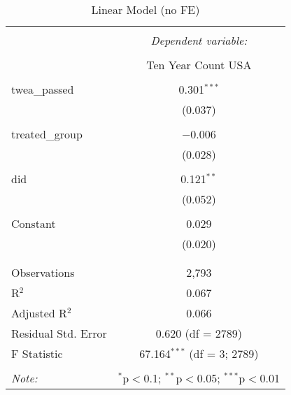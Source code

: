 
\begin{table}[!htbp] \centering 
  \caption{Linear Model (no FE)} 
  \label{table3.1} 
\begin{tabular}{@{\extracolsep{5pt}}lc} 
\\[-1.8ex]\hline 
\hline \\[-1.8ex] 
 & \multicolumn{1}{c}{\textit{Dependent variable:}} \\ 
\cline{2-2} 
\\[-1.8ex] & Ten Year Count USA \\ 
\hline \\[-1.8ex] 
 twea\_passed & 0.301$^{***}$ \\ 
  & (0.037) \\ 
  & \\ 
 treated\_group & $-$0.006 \\ 
  & (0.028) \\ 
  & \\ 
 did & 0.121$^{**}$ \\ 
  & (0.052) \\ 
  & \\ 
 Constant & 0.029 \\ 
  & (0.020) \\ 
  & \\ 
\hline \\[-1.8ex] 
Observations & 2,793 \\ 
R$^{2}$ & 0.067 \\ 
Adjusted R$^{2}$ & 0.066 \\ 
Residual Std. Error & 0.620 (df = 2789) \\ 
F Statistic & 67.164$^{***}$ (df = 3; 2789) \\ 
\hline 
\hline \\[-1.8ex] 
\textit{Note:}  & \multicolumn{1}{r}{$^{*}$p$<$0.1; $^{**}$p$<$0.05; $^{***}$p$<$0.01} \\ 
\end{tabular} 
\end{table} 
